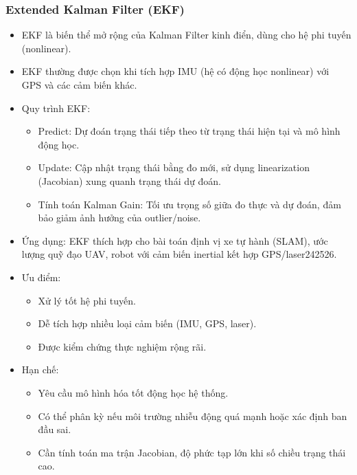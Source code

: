 \subsubsection{Extended Kalman Filter (EKF)}
\begin{itemize}
    \item EKF là biến thể mở rộng của Kalman Filter kinh điển, dùng cho hệ phi tuyến (nonlinear). 
    \item EKF thường được chọn khi tích hợp IMU (hệ có động học nonlinear) với GPS và các cảm biến khác.
    \item Quy trình EKF:
    \begin{itemize}
        \item Predict: Dự đoán trạng thái tiếp theo từ trạng thái hiện tại và mô hình động học.
        \item Update: Cập nhật trạng thái bằng đo mới, sử dụng linearization (Jacobian) xung quanh trạng thái dự đoán.
        \item Tính toán Kalman Gain: Tối ưu trọng số giữa đo thực và dự đoán, đảm bảo giảm ảnh hưởng của outlier/noise.
    \end{itemize}
    \item Ứng dụng: EKF thích hợp cho bài toán định vị xe tự hành (SLAM), ước lượng quỹ đạo UAV, robot với cảm biến inertial kết hợp GPS/laser242526.
    \item Ưu điểm:
    \begin{itemize}
        \item Xử lý tốt hệ phi tuyến.
        \item Dễ tích hợp nhiều loại cảm biến (IMU, GPS, laser).
        \item Được kiểm chứng thực nghiệm rộng rãi.
    \end{itemize}
    \item Hạn chế:
    \begin{itemize}
        \item Yêu cầu mô hình hóa tốt động học hệ thống.
        \item Có thể phân kỳ nếu môi trường nhiễu động quá mạnh hoặc xác định ban đầu sai.
        \item Cần tính toán ma trận Jacobian, độ phức tạp lớn khi số chiều trạng thái cao.
    \end{itemize}
\end{itemize}

